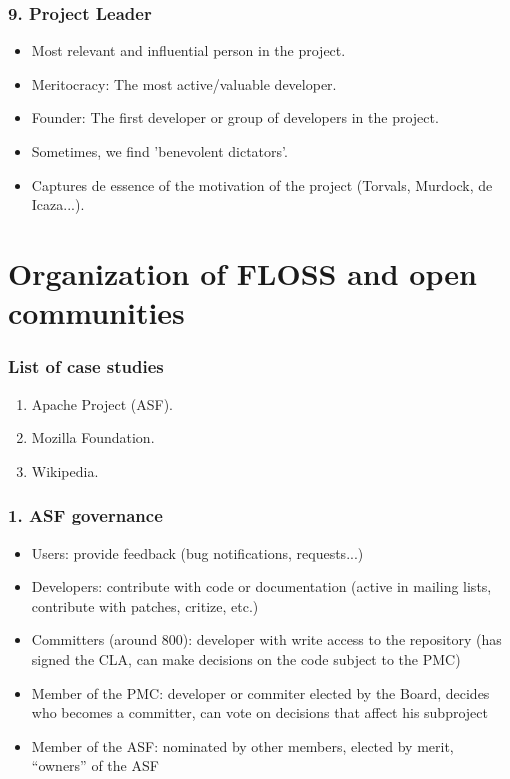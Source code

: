 \documentclass{beamer}
\begin{document}

\begin{frame}
 \frametitle{9. Project Leader}
 \begin{itemize}
  \item Most relevant and influential person in the project.
  \item Meritocracy: The most active/valuable developer.
  \item Founder: The first developer or group of developers in the project.
  \item Sometimes, we find 'benevolent dictators'.
  \item Captures de essence of the motivation of the project (Torvals, Murdock, de Icaza...).
 \end{itemize}

\end{frame}



\section{Organization of FLOSS and open communities}


\begin{frame}
\frametitle{List of case studies}
\begin{enumerate}
 \item Apache Project (ASF).
 \item Mozilla Foundation.
 \item Wikipedia.
\end{enumerate}

\end{frame}


\begin{frame}
 \frametitle{1. ASF governance}
 \begin{itemize}
  \item Users: provide feedback (bug notifications, requests...)
  \item Developers: contribute with code or documentation (active 
in mailing lists, contribute with patches, critize, etc.)
  \item Committers (around 800): developer with write access to the 
repository (has signed the CLA, can make decisions on the code subject to the PMC)
  \item Member of the PMC: developer or commiter elected by the 
Board, decides who becomes a committer, can vote on decisions that affect his subproject
  \item Member of the ASF: nominated by other members, elected by merit, ``owners'' of the ASF
 \end{itemize}

\end{frame}
\end{document}
